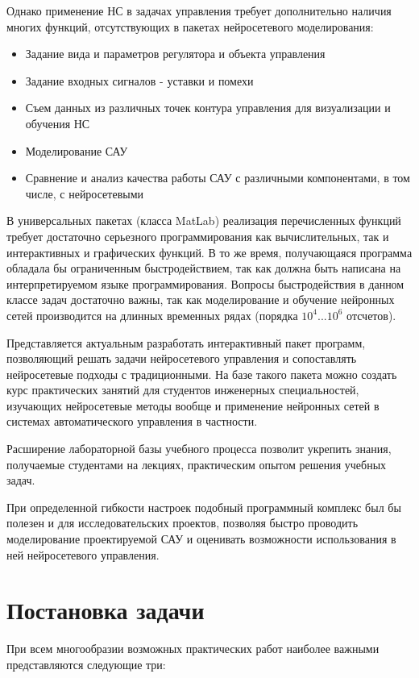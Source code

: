 Однако применение НС в задачах управления требует дополнительно
наличия многих функций, отсутствующих в пакетах нейросетевого
моделирования:

\begin{itemize}
\item Задание вида и параметров регулятора и объекта управления
\item Задание входных сигналов - уставки и помехи
\item Съем данных из различных точек контура управления для
  визуализации и обучения НС
\item Моделирование САУ
\item Сравнение и анализ качества работы САУ с различными
  компонентами, в том числе, с нейросетевыми
\end{itemize}

В универсальных пакетах (класса MatLab) реализация перечисленных
функций требует достаточно серьезного программирования как
вычислительных, так и интерактивных и графических функций.  В то же
время, получающаяся программа обладала бы ограниченным
быстродействием, так как должна быть написана на интерпретируемом
языке программирования.  Вопросы быстродействия в данном классе задач
достаточно важны, так как моделирование и обучение нейронных сетей
производится на длинных временных рядах (порядка $10^4 ... 10^6$
отсчетов).

Представляется актуальным разработать интерактивный пакет программ,
позволяющий решать задачи нейросетевого управления и сопоставлять
нейросетевые подходы с традиционными.  На базе такого пакета можно
создать курс практических занятий для студентов инженерных
специальностей, изучающих нейросетевые методы вообще и применение
нейронных сетей в системах автоматического управления в частности.

Расширение лабораторной базы учебного процесса позволит укрепить
знания, получаемые студентами на лекциях, практическим опытом решения
учебных задач.  

При определенной гибкости настроек подобный программный комплекс был
бы полезен и для исследовательских проектов, позволяя быстро проводить
моделирование проектируемой САУ и оценивать возможности использования
в ней нейросетевого управления.

\section{Постановка задачи}

При всем многообразии возможных практических работ наиболее важными
представляются следующие три:

